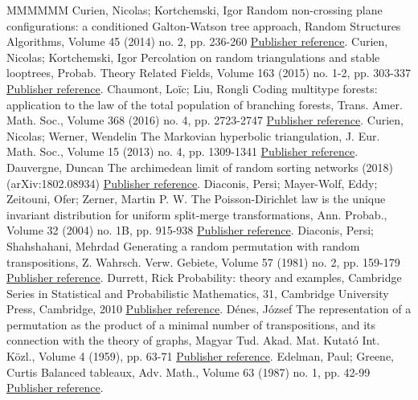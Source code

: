 \begin{thebibliography}{MMMMMM}
 Curien, Nicolas; Kortchemski, Igor Random non-crossing plane configurations: a conditioned Galton-Watson tree approach, Random Structures Algorithms, Volume 45 (2014) no. 2, pp. 236-260 \href{https://ahl.centre-mersenne.org/item/AHL_2018__1__149_0/#CK14}{Publisher reference}.
 Curien, Nicolas; Kortchemski, Igor Percolation on random triangulations and stable looptrees, Probab. Theory Related Fields, Volume 163 (2015) no. 1-2, pp. 303-337 \href{https://ahl.centre-mersenne.org/item/AHL_2018__1__149_0/#CK15}{Publisher reference}.
 Chaumont, Loïc; Liu, Rongli Coding multitype forests: application to the law of the total population of branching forests, Trans. Amer. Math. Soc., Volume 368 (2016) no. 4, pp. 2723-2747 \href{https://ahl.centre-mersenne.org/item/AHL_2018__1__149_0/#CL16}{Publisher reference}.
 Curien, Nicolas; Werner, Wendelin The Markovian hyperbolic triangulation, J. Eur. Math. Soc., Volume 15 (2013) no. 4, pp. 1309-1341 \href{https://ahl.centre-mersenne.org/item/AHL_2018__1__149_0/#CWmht}{Publisher reference}.
 Dauvergne, Duncan The archimedean limit of random sorting networks (2018) (arXiv:1802.08934) \href{https://ahl.centre-mersenne.org/item/AHL_2018__1__149_0/#dauvergne2018archimedean}{Publisher reference}.
 Diaconis, Persi; Mayer-Wolf, Eddy; Zeitouni, Ofer; Zerner, Martin P. W. The Poisson-Dirichlet law is the unique invariant distribution for uniform split-merge transformations, Ann. Probab., Volume 32 (2004) no. 1B, pp. 915-938 \href{https://ahl.centre-mersenne.org/item/AHL_2018__1__149_0/#DMZZ04}{Publisher reference}.
 Diaconis, Persi; Shahshahani, Mehrdad Generating a random permutation with random transpositions, Z. Wahrsch. Verw. Gebiete, Volume 57 (1981) no. 2, pp. 159-179 \href{https://ahl.centre-mersenne.org/item/AHL_2018__1__149_0/#DS81}{Publisher reference}.
 Durrett, Rick Probability: theory and examples, Cambridge Series in Statistical and Probabilistic Mathematics, 31, Cambridge University Press, Cambridge, 2010 \href{https://ahl.centre-mersenne.org/item/AHL_2018__1__149_0/#Dur10}{Publisher reference}.
 Dénes, József The representation of a permutation as the product of a minimal number of transpositions, and its connection with the theory of graphs, Magyar Tud. Akad. Mat. Kutató Int. Közl., Volume 4 (1959), pp. 63-71 \href{https://ahl.centre-mersenne.org/item/AHL_2018__1__149_0/#Den59}{Publisher reference}.
 Edelman, Paul; Greene, Curtis Balanced tableaux, Adv. Math., Volume 63 (1987) no. 1, pp. 42-99 \href{https://ahl.centre-mersenne.org/item/AHL_2018__1__149_0/#EG87}{Publisher reference}.

\end{thebibliography}
